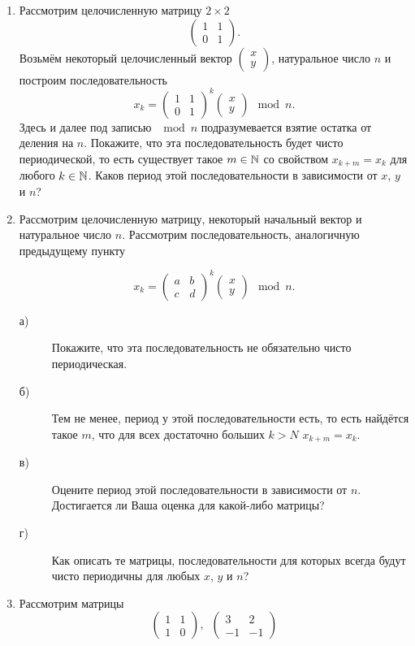 \begin{enumerate}
\item Рассмотрим целочисленную матрицу $2\times 2$ 
$$\left(\begin{matrix}
1 & 1 \\
0 & 1 
\end{matrix}\right).$$
Возьмём некоторый целочисленный вектор $\left(\begin{smallmatrix} x  \\ y \end{smallmatrix}\right)$, натуральное число $n$ и построим последовательность
$$x_k=\left(\begin{matrix}
1 & 1 \\
0 & 1 
\end{matrix}\right)^k \left(\begin{matrix} x \\ y \end{matrix}\right) \mod n.$$
Здесь и далее под записью $\mod n$ подразумевается взятие остатка от деления на $n$.
Покажите, что эта последовательность будет чисто периодической, то есть существует такое $m\in \mathbb{N}$ со свойством $x_{k+m}=x_k$ для любого $k\in\mathbb{N}$. Каков период этой последовательности в зависимости от $x$, $y$ и $n$?
\item Рассмотрим целочисленную матрицу, некоторый начальный вектор и натуральное число $n$. Рассмотрим последовательность, аналогичную предыдущему пункту

$$x_k=\left(\begin{matrix}
a & b \\
c & d
\end{matrix}\right)^k\left(\begin{matrix} x \\ y \end{matrix}\right) \mod n.$$
\begin{description}
\item[а)] Покажите, что эта последовательность не обязательно чисто периодическая.
\item[б)] Тем не менее, период у этой последовательности есть, то есть найдётся такое $m$, что для всех достаточно больших $k>N$ $x_{k+m}=x_k$. 
\item[в)] Оцените период этой последовательности в зависимости от $n$. Достигается ли Ваша оценка для какой-либо матрицы?
\item[г)] Как описать те матрицы, последовательности для которых всегда будут чисто периодичны для любых $x$, $y$ и $n$?
\end{description}
\item Рассмотрим матрицы 
$$\left(\begin{matrix}
1 & 1 \\
1 & 0
\end{matrix}\right), \,\,\,\left(\begin{matrix}
3 & 2 \\
-1 & -1
\end{matrix}\right)
$$


\end{enumerate}
